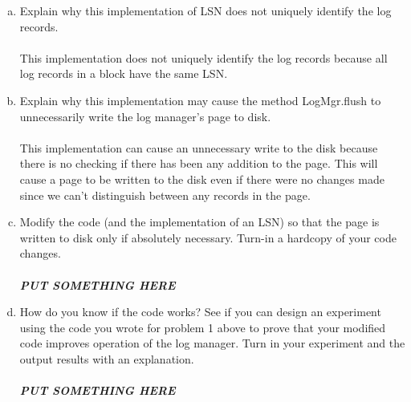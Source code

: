 \documentclass [letter,12pt] {article}
\begin{document}
    \begin{enumerate}[(a)]
        \item Explain why this implementation of LSN does not uniquely
            identify the log records.
            \\\\
            This implementation does not uniquely identify the log
            records because all log records in a block have the same
            LSN.
        \item Explain why this implementation may cause the method 
            LogMgr.flush to unnecessarily write the log manager’s page 
            to disk.
            \\\\
            This implementation can cause an unnecessary write to the
            disk because there is no checking if there has been any 
            addition to the page. This will cause a page to be written
            to the disk even if there were no changes made since we 
            can't distinguish between any records in the page.
        \item Modify the code (and the implementation of an LSN) so that
            the page is written to disk only if absolutely necessary. 
            Turn-in a hardcopy of your code changes.
            \\\\
            \textit{\textbf{PUT SOMETHING HERE}}
        \item How do you know if the code works? See if you can design 
            an experiment using the code you wrote for problem 1 above
            to prove that your modified code improves operation of the 
            log manager. Turn in your experiment and the output results 
            with an explanation.
            \\\\
            \textit{\textbf{PUT SOMETHING HERE}}
    \end{enumerate}
\end{document}
